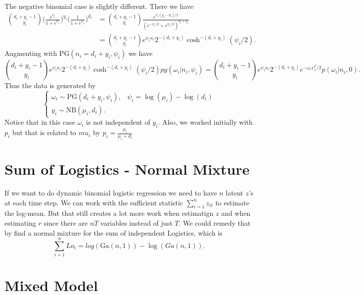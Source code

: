 \documentclass[draft]{article}
\newcommand{\PG}{\text{PG}}
\newcommand{\Ga}{\text{Ga}}
\newcommand{\NB}{\text{NB}}
\begin{document}
The negative binomial case is slightly different.  There we have
\begin{align*}
{d_i + y_i - 1 \choose y_i} \Big( \frac{e^{\psi_i}}{1 + e^{\psi_i}} \Big)^{y_i}
\Big( \frac{1}{1 + e^{\psi_i}} \Big)^{d_i}
& = 
{d_i + y_i - 1 \choose y_i} \frac{e^{\psi_i (y_i - d_i) /
    2}}{(e^{-\psi_i/2}+e^{\psi_i/2})^{d_i+y_i}} \\
& = {d_i + y_i - 1 \choose y_i} e^{\psi_i \kappa_i} 2^{-(d_i+y_i)}
\cosh^{-(d_i+y_i)}(\psi_i/2). 
\end{align*}
Augmenting with $\PG(n_i = d_i + y_i, \psi_i)$ we have
\[
 {d_i + y_i - 1 \choose y_i} e^{\psi_i \kappa_i} 2^{-(d_i+y_i)}
\cosh^{-(d_i+y_i)}(\psi_i/2) pg(\omega_i | n_i, \psi_i)
= {d_i + y_i - 1 \choose y_i} e^{\psi_i \kappa_i} 2^{-(d_i+y_i)} e^{-\omega_i
\psi_i^2 / 2} p(\omega_i | n_i, 0).
\]
Thus the data is generated by
\[
\begin{cases}
\omega_i \sim \PG(d_i+y_i, \psi_i), & \psi_i = \log(\mu_i) - \log(d_i) \\
y_i \sim \NB(\mu_i, d_i).
\end{cases}
\]
Notice that in this case $\omega_i$ is not independent of $y_i$.  Also, we
worked initially with $p_i$ but that is related to $mu_i$ by $p_i =
\frac{\mu_i}{\mu_i + d_i}$

\section{Sum of Logistics - Normal Mixture}

If we want to do dynamic binomial logistic regression we need to have $n$ latent
$z$'s at each time step.  We can work with the sufficient statistic
$\sum_{i=1}^n z_{it}$ to estimate the log-mean.  But that still creates a lot
more work when estimatign $z$ and when estimating $r$ since there are $nT$
variables instead of just $T$.  We could remedy that by find a normal mixture
for the sum of independent Logistics, which is
\[
\sum_{i=1}^n Lo_i = log(\Ga(n,1)) - \log(Ga(n,1)).
\]

\section{Mixed Model}
\end{document}
